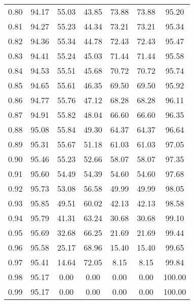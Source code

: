 \begin{tabular}{|c|c|c|c|c|c|c|}
      0.80 &     94.17 &     55.03 &      43.85 &   73.88 &      73.88 &         95.20 \\
      0.81 &     94.27 &     55.23 &      44.34 &   73.21 &      73.21 &         95.34 \\
      0.82 &     94.36 &     55.34 &      44.78 &   72.43 &      72.43 &         95.47 \\
      0.83 &     94.41 &     55.24 &      45.03 &   71.44 &      71.44 &         95.58 \\
      0.84 &     94.53 &     55.51 &      45.68 &   70.72 &      70.72 &         95.74 \\
      0.85 &     94.65 &     55.61 &      46.35 &   69.50 &      69.50 &         95.92 \\
      0.86 &     94.77 &     55.76 &      47.12 &   68.28 &      68.28 &         96.11 \\
      0.87 &     94.91 &     55.82 &      48.04 &   66.60 &      66.60 &         96.35 \\
      0.88 &     95.08 &     55.84 &      49.30 &   64.37 &      64.37 &         96.64 \\
      0.89 &     95.31 &     55.67 &      51.18 &   61.03 &      61.03 &         97.05 \\
      0.90 &     95.46 &     55.23 &      52.66 &   58.07 &      58.07 &         97.35 \\
      0.91 &     95.60 &     54.49 &      54.39 &   54.60 &      54.60 &         97.68 \\
      0.92 &     95.73 &     53.08 &      56.58 &   49.99 &      49.99 &         98.05 \\
      0.93 &     95.85 &     49.51 &      60.02 &   42.13 &      42.13 &         98.58 \\
      0.94 &     95.79 &     41.31 &      63.24 &   30.68 &      30.68 &         99.10 \\
      0.95 &     95.69 &     32.68 &      66.25 &   21.69 &      21.69 &         99.44 \\
      0.96 &     95.58 &     25.17 &      68.96 &   15.40 &      15.40 &         99.65 \\
      0.97 &     95.41 &     14.64 &      72.05 &    8.15 &       8.15 &         99.84 \\
      0.98 &     95.17 &      0.00 &       0.00 &    0.00 &       0.00 &        100.00 \\
      0.99 &     95.17 &      0.00 &       0.00 &    0.00 &       0.00 &        100.00 \\
\bottomrule
\end{tabular}
